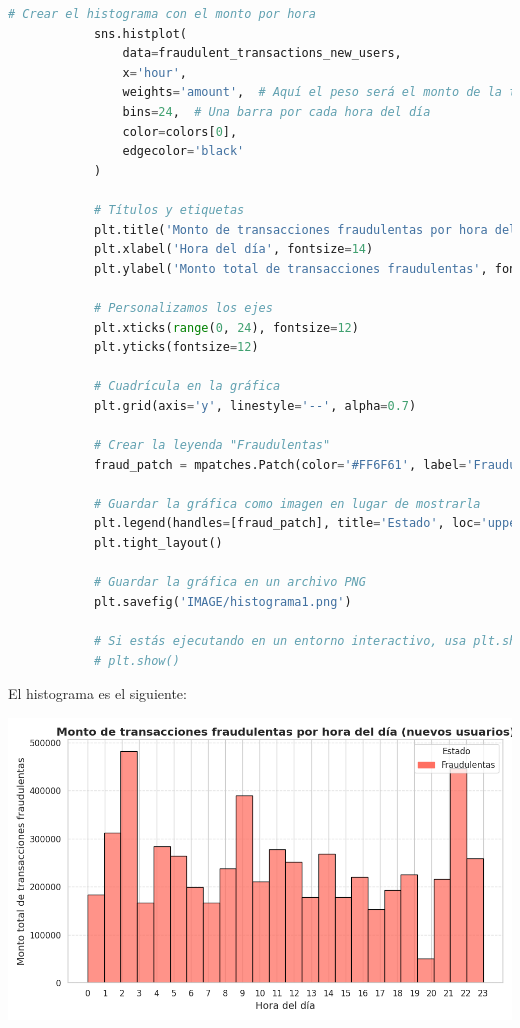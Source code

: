 \documentclass{article}
\begin{document}
\begin{itemize}
\begin{lstlisting}[language=Python, caption=Implementación del Histograma del monto de transacciones por hora del día]
            # Crear el histograma con el monto por hora
            sns.histplot(
                data=fraudulent_transactions_new_users,
                x='hour', 
                weights='amount',  # Aquí el peso será el monto de la transacción
                bins=24,  # Una barra por cada hora del día
                color=colors[0],
                edgecolor='black'
            )
            
            # Títulos y etiquetas
            plt.title('Monto de transacciones fraudulentas por hora del día (nuevos usuarios)', fontsize=16, fontweight='bold')
            plt.xlabel('Hora del día', fontsize=14)
            plt.ylabel('Monto total de transacciones fraudulentas', fontsize=14)
            
            # Personalizamos los ejes
            plt.xticks(range(0, 24), fontsize=12)
            plt.yticks(fontsize=12)
            
            # Cuadrícula en la gráfica
            plt.grid(axis='y', linestyle='--', alpha=0.7)
            
            # Crear la leyenda "Fraudulentas"
            fraud_patch = mpatches.Patch(color='#FF6F61', label='Fraudulentas')
            
            # Guardar la gráfica como imagen en lugar de mostrarla
            plt.legend(handles=[fraud_patch], title='Estado', loc='upper right', fontsize=12)
            plt.tight_layout()
            
            # Guardar la gráfica en un archivo PNG
            plt.savefig('IMAGE/histograma1.png')
            
            # Si estás ejecutando en un entorno interactivo, usa plt.show() en lugar de guardar.
            # plt.show()
        \end{lstlisting}

        El histograma es el siguiente:

        \begin{center}
            \includegraphics[scale=0.5]{IMAGE/histograma1.png}
        \end{center}


\end{itemize}
\end{document}
